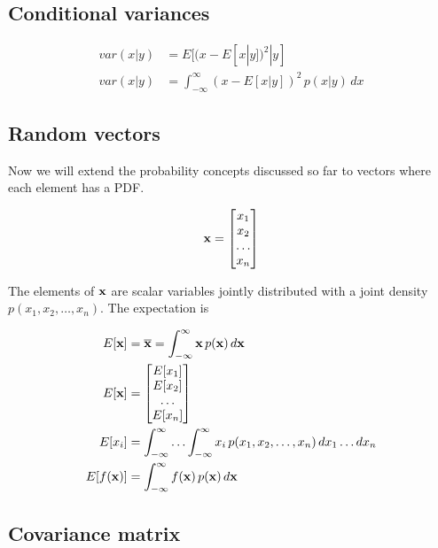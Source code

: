 \subsection{Conditional variances}

\begin{align*}
  var(x|y) &= E[(x - E[x|y])^2|y] \\
  var(x|y) &= \int_{-\infty}^\infty (x - E[x|y])^2 \,p(x|y) \,dx
\end{align*}

\subsection{Random vectors}

Now we will extend the probability concepts discussed so far to vectors where
each element has a PDF.

\begin{equation*}
  \mathbf{x} = \begin{bmatrix}
    x_1 \\
    x_2 \\
    \ldots \\
    x_n
  \end{bmatrix}
\end{equation*}

The elements of $\mathbf{x}$ are scalar variables jointly distributed with a joint
density $p(x_1, x_2, \ldots, x_n)$. The expectation is

\begin{align*}
  E[\mathbf{x}] &= \overline{\mathbf{x}} = \int_{-\infty}^\infty \mathbf{x} \,p(\mathbf{x})
    \,d\mathbf{x} \\
  E[\mathbf{x}] &= \begin{bmatrix}
    E[x_1] \\
    E[x_2] \\
    \ldots \\
    E[x_n]
  \end{bmatrix} \\
  E[x_i] &= \int_{-\infty}^\infty \ldots \int_{-\infty}^\infty x_i
    \,p(x_1, x_2, \ldots, x_n) \,dx_1 \ldots dx_n \\
  E[f(\mathbf{x})] &= \int_{-\infty}^\infty f(\mathbf{x}) \,p(\mathbf{x}) \,d\mathbf{x}
\end{align*}

\subsection{Covariance matrix}

